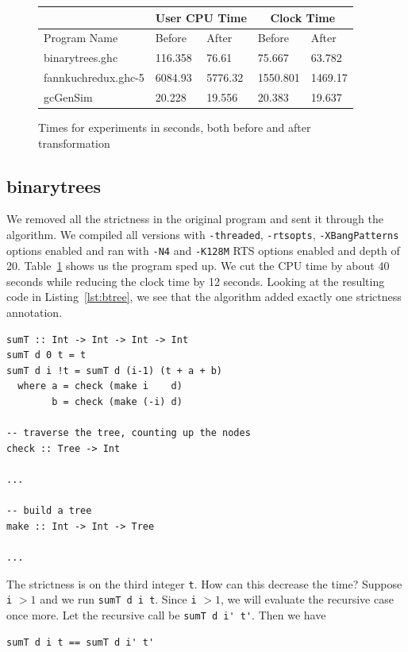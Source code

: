 \documentclass[preprint,nocopyrightspace]{sigplanconf}
\begin{document}
\begin{figure}[t]
\begin{tabular}{|l|l|l|l|l|}
\hline
 & \multicolumn{2}{|c|}{User CPU Time} & \multicolumn{2}{|c|}{Clock Time}\\
\hline
Program Name & Before & After & Before & After\\
\hline
binarytrees.ghc & 116.358 & 76.61 & 75.667 & 63.782\\
\hline
fannkuchredux.ghc-5 & 6084.93 & 5776.32 & 1550.801 & 1469.17\\
\hline
gcGenSim & 20.228 & 19.556 & 20.383 & 19.637\\
\hline
\end{tabular}
\label{tab:expr}
\caption{Times for experiments in seconds, both before and after transformation}
\end{figure}
\subsection{binarytrees}
We removed all the strictness in the original program and sent it through the algorithm. We compiled all versions with \lstinline!-threaded!, \lstinline!-rtsopts!, \lstinline!-XBangPatterns! options enabled and ran with \lstinline!-N4! and \lstinline!-K128M! RTS options enabled and depth of 20. Table~\ref{tab:expr} shows us the program sped up. We cut the CPU time by about 40 seconds while reducing the clock time by 12 seconds. Looking at the resulting code in Listing~\ref{lst:btree}, we see that the algorithm added exactly one strictness annotation.
\begin{lstlisting}[float,frame=single,caption=Changes in \lstinline!binarytrees! after applying the genetic algorithm,label=lst:btree]
sumT :: Int -> Int -> Int -> Int
sumT d 0 t = t
sumT d i !t = sumT d (i-1) (t + a + b)
  where a = check (make i    d)
        b = check (make (-i) d)

-- traverse the tree, counting up the nodes
check :: Tree -> Int

...

-- build a tree
make :: Int -> Int -> Tree

...
\end{lstlisting}
The strictness is on the third integer \lstinline!t!. How can this decrease the time? Suppose \lstinline!i! $ > 1$ and we run \lstinline!sumT d i t!. Since \lstinline!i! $ > 1$, we will evaluate the recursive case once more. Let the recursive call be \lstinline!sumT d i' t'!. Then we have 
\begin{lstlisting}
sumT d i t == sumT d i' t'
\end{lstlisting}
\end{document}
